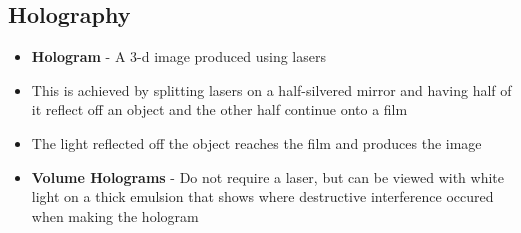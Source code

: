\subsection{Holography}
\begin{itemize}
    \item \textbf{Hologram} - A 3-d image produced using lasers
    \item This is achieved by splitting lasers on a half-silvered mirror and having half of it reflect off an object and the other half continue onto a film
    \item The light reflected off the object reaches the film and produces the image
    \item \textbf{Volume Holograms} - Do not require a laser, but can be viewed with white light on a thick emulsion that shows where destructive interference occured when making the hologram
\end{itemize}

\newpage